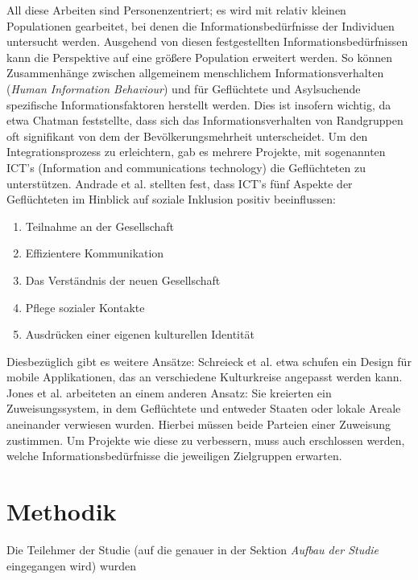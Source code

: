 All diese Arbeiten sind Personenzentriert; es wird mit relativ kleinen Populationen gearbeitet, bei denen die Informationsbedürfnisse der Individuen untersucht werden. Ausgehend von diesen festgestellten Informationsbedürfnissen kann die Perspektive auf eine größere Population erweitert werden. So können Zusammenhänge zwischen allgemeinem menschlichem Informationsverhalten (\textit{Human Information Behaviour}) und für Geflüchtete und Asylsuchende spezifische Informationsfaktoren herstellt werden.\cite{oduntan2017investigating}\newline
Dies ist insofern wichtig, da etwa Chatman feststellte, dass sich das Informationsverhalten von Randgruppen oft signifikant von dem der Bev\"olkerungsmehrheit unterscheidet. \cite{chatman1996impoverished}
\newline
\newline 
Um den Integrationsprozess zu erleichtern, gab es mehrere Projekte, mit sogenannten ICT's (Information and communications technology) die Geflüchteten zu unterstützen. Andrade et al. stellten fest, dass ICT's  f\"unf Aspekte der Gefl\"uchteten im Hinblick auf soziale Inklusion positiv beeinflussen:
\begin{enumerate}
    \item   Teilnahme an der Gesellschaft
    \item   Effizientere Kommunikation
    \item   Das Verst\"andnis der neuen Gesellschaft
    \item   Pflege sozialer Kontakte
    \item   Ausdr\"ucken einer eigenen kulturellen Identit\"at
\end{enumerate}
Diesbez\"uglich gibt es weitere Ans\"atze:\newline
Schreieck et al. etwa schufen ein Design f\"ur mobile Applikationen, das an verschiedene Kulturkreise angepasst werden kann. \cite{schreieck2017supporting}\newline
Jones et al. arbeiteten an einem anderen Ansatz: Sie kreierten ein Zuweisungssystem, in dem Gefl\"uchtete und entweder Staaten oder lokale Areale aneinander verwiesen wurden. Hierbei m\"ussen beide Parteien einer Zuweisung zustimmen. \cite{jones2017matching}\newline
Um Projekte wie diese zu verbessern, muss auch erschlossen werden, welche Informationsbed\"urfnisse die jeweiligen Zielgruppen erwarten.\newline

\section{Methodik}
Die Teilehmer der Studie (auf die genauer in der Sektion \textit{Aufbau der Studie} eingegangen wird) wurden
